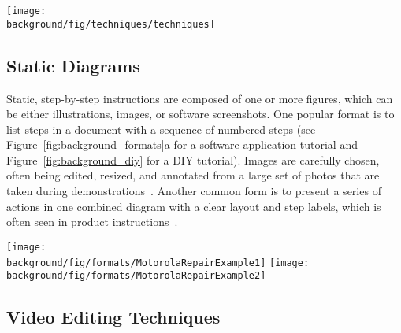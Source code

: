 \clearpage

\begin{table*}[!htbp]
  \centering
  \texttt{[image: \\background/fig/techniques/techniques]}
  \caption{A list of annotation techniques that are often used to provide instructions. Examples are selected from stroller instructions~\cite{MountainBuggyInstructions}. Reproduced with permission.}
  \label{background_annotation_techniques}
\end{table*}

\clearpage


\subsection{Static Diagrams}

Static, step-by-step instructions are composed of one or more figures, which can be either illustrations, images, or software screenshots. One popular format is to list steps in a document with a sequence of numbered steps (see Figure~\ref{fig:background_formats}a for a software application tutorial and Figure~\ref{fig:background_diy} for a DIY tutorial). Images are carefully chosen, often being edited, resized, and annotated from a large set of photos that are taken during demonstrations~\cite{Tseng:2014:PVP:2598510.2598540}.
%
Another common form is to present a series of actions in one combined diagram with a clear layout and step labels, which is often seen in product instructions~\cite{mijksenaar1999open}.

\begin{figure*}[ht!]
  \centering
  \texttt{[image: \\background/fig/formats/MotorolaRepairExample1]}
  \texttt{[image: \\background/fig/formats/MotorolaRepairExample2]}
  \caption{
    An example of 5-step static tutorials for a DIY task. Tutorial by David Hodson~\cite{MotorolaRepairExample}, licensed under CC BY 3.0.
  }
  \label{fig:background_diy}
\end{figure*}

\clearpage


\subsection{Video Editing Techniques}

